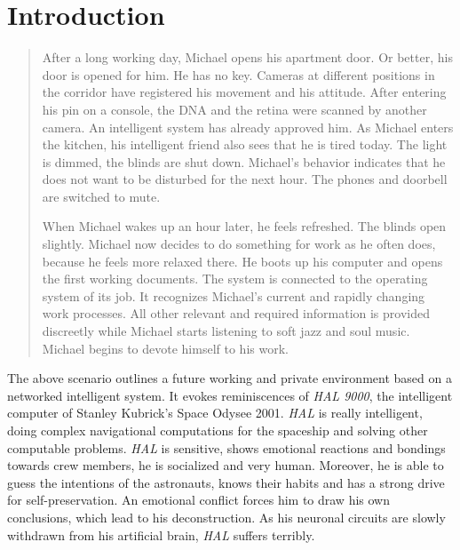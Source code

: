 
\chapter{Introduction}
\label{introduction}

\begin{quotation}
After a long working day, Michael opens his apartment door. Or better, his door is opened for him. He has no key. Cameras at different positions in the corridor have registered his movement and his attitude. After entering his pin on a console, the DNA and the retina were scanned by another camera. An intelligent system has already approved him. As Michael enters the kitchen, his intelligent friend also sees that he is tired today. The light is dimmed, the blinds are shut down. Michael's behavior indicates that he does not want to be disturbed for the next hour. The phones and doorbell are switched to mute.

When Michael wakes up an hour later, he feels refreshed. The blinds open slightly. Michael now decides to do something for work as he often does, because he feels more relaxed there. He boots up his computer and opens the first working documents. The system is connected to the operating system of its job. It recognizes Michael's current and rapidly changing work processes. All other relevant and required information is provided discreetly while Michael starts listening to soft jazz and soul music. Michael begins to devote himself to his work.
\end{quotation}
The above scenario outlines a future working and private environment based on a networked intelligent system. It evokes reminiscences of \textit{HAL 9000}, the intelligent computer of Stanley Kubrick's Space Odysee 2001. \textit{HAL} is really intelligent, doing complex navigational computations for the spaceship and solving other computable problems. \textit{HAL} is sensitive, shows emotional reactions and bondings towards crew members, he is socialized and very human. Moreover, he is able to guess the intentions of the astronauts, knows their habits and has a strong drive for self-preservation. An emotional conflict forces him to draw his own conclusions, which lead to his deconstruction. As his neuronal circuits are slowly withdrawn from his artificial brain, \textit{HAL} suffers terribly. 

